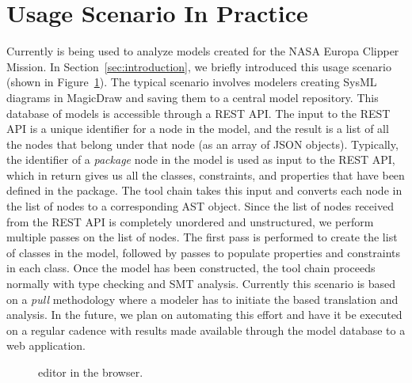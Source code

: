 \section{Usage Scenario In Practice}

Currently \Klang{} is being used to analyze models created for the
NASA Europa Clipper Mission. In Section~\ref{sec:introduction}, we
briefly introduced this usage scenario (shown in
Figure~\ref{fig:k}). The typical scenario involves modelers creating
SysML diagrams in MagicDraw and saving them to a central model
repository. This database of models is accessible through a REST
API. The input to the REST API is a unique identifier for a node in
the model, and the result is a list of all the nodes that belong under
that node (as an array of JSON objects). Typically, the identifier of
a {\em package} node in the model is used as input to the REST API,
which in return gives us all the classes, constraints, and properties
that have been defined in the package. The \Klang{} tool chain takes
this input and converts each node in the list of nodes to a
corresponding \Klang{} AST object. Since the list of nodes received
from the REST API is completely unordered and unstructured, we perform
multiple passes on the list of nodes. The first pass is performed to
create the list of classes in the model, followed by passes to
populate properties and constraints in each class. Once the \Klang{}
model has been constructed, the \Klang{} tool chain proceeds normally
with type checking and SMT analysis. Currently this scenario is based
on a {\em pull} methodology where a modeler has to initiate the
\Klang{} based translation and analysis. In the future, we plan on
automating this effort and have it be executed on a regular cadence
with results made available through the model database to a web
application.

\begin{figure}
\centering
{}
\caption{\Klang{} editor in the browser.}
\label{fig:k}
\end{figure}

